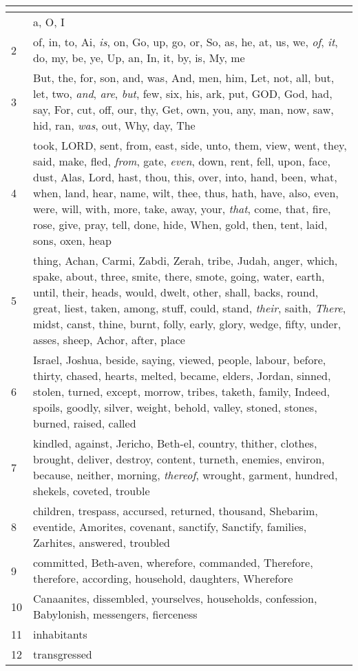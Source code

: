 \begin{center}
\begin{longtable}{l|p{3.75in}}
\hline \multicolumn{2}{c}{{ }} \\ \hline
\endfoot 
1 & a, O, I\\ \hline 
2 & of, in, to, Ai, \emph{is}, on, Go, up, go, or, So, as, he, at, us, we, \emph{of}, \emph{it}, do, my, be, ye, Up, an, In, it, by, is, My, me\\ \hline 
3 & But, the, for, son, and, was, And, men, him, Let, not, all, but, let, two, \emph{and}, \emph{are}, \emph{but}, few, six, his, ark, put, GOD, God, had, say, For, cut, off, our, thy, Get, own, you, any, man, now, saw, hid, ran, \emph{was}, out, Why, day, The\\ \hline 
4 & took, LORD, sent, from, east, side, unto, them, view, went, they, said, make, fled, \emph{from}, gate, \emph{even}, down, rent, fell, upon, face, dust, Alas, Lord, hast, thou, this, over, into, hand, been, what, when, land, hear, name, wilt, thee, thus, hath, have, also, even, were, will, with, more, take, away, your, \emph{that}, come, that, fire, rose, give, pray, tell, done, hide, When, gold, then, tent, laid, sons, oxen, heap\\ \hline 
5 & thing, Achan, Carmi, Zabdi, Zerah, tribe, Judah, anger, which, spake, about, three, smite, there, smote, going, water, earth, until, their, heads, would, dwelt, other, shall, backs, round, great, liest, taken, among, stuff, could, stand, \emph{their}, saith, \emph{There}, midst, canst, thine, burnt, folly, early, glory, wedge, fifty, under, asses, sheep, Achor, after, place\\ \hline 
6 & Israel, Joshua, beside, saying, viewed, people, labour, before, thirty, chased, hearts, melted, became, elders, Jordan, sinned, stolen, turned, except, morrow, tribes, taketh, family, Indeed, spoils, goodly, silver, weight, behold, valley, stoned, stones, burned, raised, called\\ \hline 
7 & kindled, against, Jericho, Beth-el, country, thither, clothes, brought, deliver, destroy, content, turneth, enemies, environ, because, neither, morning, \emph{thereof}, wrought, garment, hundred, shekels, coveted, trouble\\ \hline 
8 & children, trespass, accursed, returned, thousand, Shebarim, eventide, Amorites, covenant, sanctify, Sanctify, families, Zarhites, answered, troubled\\ \hline 
9 & committed, Beth-aven, wherefore, commanded, Therefore, therefore, according, household, daughters, Wherefore\\ \hline 
10 & Canaanites, dissembled, yourselves, households, confession, Babylonish, messengers, fierceness\\ \hline 
11 & inhabitants\\ \hline 
12 & transgressed\\ \hline 
\end{longtable}
\end{center}





